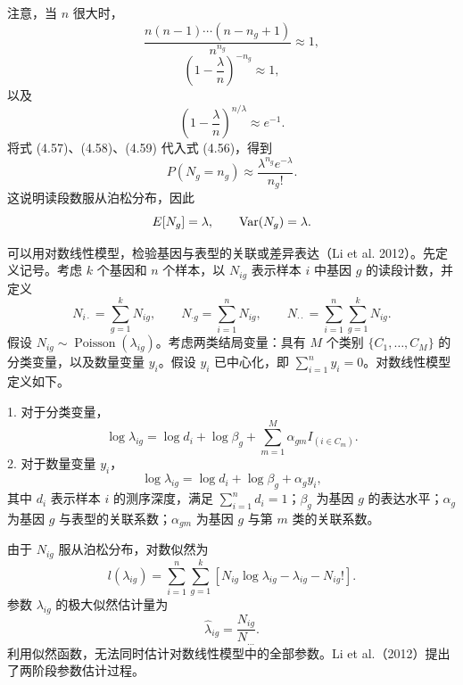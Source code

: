 注意，当 $n$ 很大时，
\begin{equation}
\frac{n(n-1)\cdots(n-n_g+1)}{n^{n_g}}\approx1,
\tag{4.57}
\end{equation}
\begin{equation}
\left(1-\frac\lambda n\right)^{-n_g}\approx1,
\tag{4.58}
\end{equation}
以及
\begin{equation}
\left(1-\frac\lambda n\right)^{n/\lambda}\approx e^{-1}.
\tag{4.59}
\end{equation}
将式 (4.57)、(4.58)、(4.59) 代入式 (4.56)，得到
\begin{equation}
P(N_g=n_g)\approx\frac{\lambda^{n_g}e^{-\lambda}}{n_g!}.
\tag{4.60}
\end{equation}
这说明读段数服从泊松分布，因此
\[
E[N_g]=\lambda,\qquad\operatorname{Var}(N_g)=\lambda.
\]

可以用对数线性模型，检验基因与表型的关联或差异表达（Li et al. 2012）。先定义记号。考虑 $k$ 个基因和 $n$ 个样本，以 $N_{ig}$ 表示样本 $i$ 中基因 $g$ 的读段计数，并定义
\[
N_{i\cdot}=\sum_{g=1}^{k}N_{ig},\qquad
N_{\cdot g}=\sum_{i=1}^{n}N_{ig},\qquad
N_{\cdot\cdot}=\sum_{i=1}^{n}\sum_{g=1}^{k}N_{ig}.
\]
假设 $N_{ig}\sim\operatorname{Poisson}(\lambda_{ig})$。考虑两类结局变量：具有 $M$ 个类别 $\{C_1,\ldots,C_M\}$ 的分类变量，以及数量变量 $y_i$。假设 $y_i$ 已中心化，即 $\sum_{i=1}^{n}y_i=0$。对数线性模型定义如下。

1. 对于分类变量，
\begin{equation}
\log\lambda_{ig}=\log d_i+\log\beta_g+\sum_{m=1}^{M}\alpha_{gm}I_{(i\in C_m)}.
\tag{4.61}
\end{equation}
2. 对于数量变量 $y_i$，
\begin{equation}
\log\lambda_{ig}=\log d_i+\log\beta_g+\alpha_gy_i,
\tag{4.62}
\end{equation}
其中 $d_i$ 表示样本 $i$ 的测序深度，满足 $\sum_{i=1}^{n}d_i=1$；$\beta_g$ 为基因 $g$ 的表达水平；$\alpha_g$ 为基因 $g$ 与表型的关联系数；$\alpha_{gm}$ 为基因 $g$ 与第 $m$ 类的关联系数。

由于 $N_{ig}$ 服从泊松分布，对数似然为
\begin{equation}
l(\lambda_{ig})=\sum_{i=1}^{n}\sum_{g=1}^{k}
\left[N_{ig}\log\lambda_{ig}-\lambda_{ig}-N_{ig}!\right].
\tag{4.63}
\end{equation}
参数 $\lambda_{ig}$ 的极大似然估计量为
\begin{equation}
\hat\lambda_{ig}=\frac{N_{ig}}{N_{\ldots}}.
\tag{4.64}
\end{equation}
利用似然函数，无法同时估计对数线性模型中的全部参数。Li et al.（2012）提出了两阶段参数估计过程。

